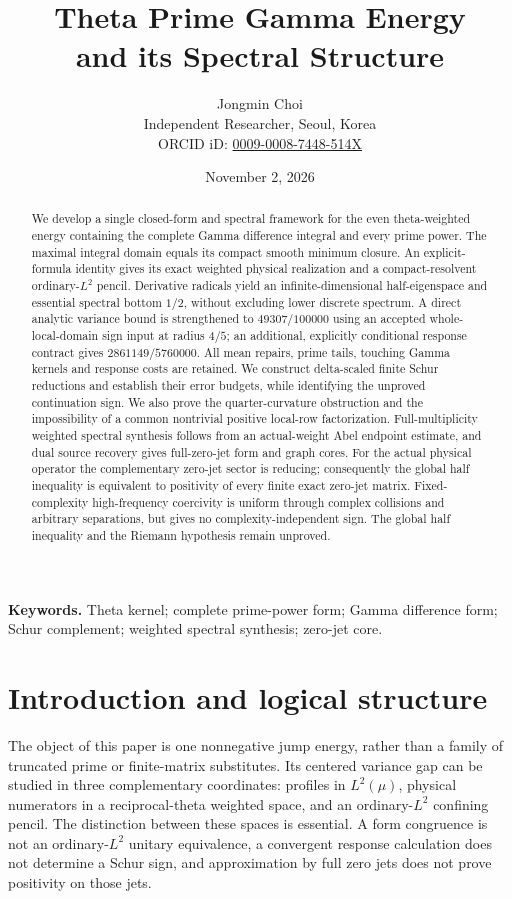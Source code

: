 \documentclass[11pt,a4paper]{article}
\title{Theta Prime Gamma Energy\\and its Spectral Structure}
\author{Jongmin Choi\\[3pt]\small Independent Researcher, Seoul, Korea\\\small ORCID iD: \href{https://orcid.org/0009-0008-7448-514X}{0009-0008-7448-514X}}
\date{November 2, 2026}
\numberwithin{equation}{section}
\theoremstyle{definition}\newtheorem{definition}[theorem]{Definition}
\theoremstyle{remark}\newtheorem{remark}[theorem]{Remark}
\begin{document}
\maketitle
\begin{abstract}
We develop a single closed-form and spectral framework for the even theta-weighted energy containing the complete Gamma difference integral and every prime power. The maximal integral domain equals its compact smooth minimum closure. An explicit-formula identity gives its exact weighted physical realization and a compact-resolvent ordinary-$L^2$ pencil. Derivative radicals yield an infinite-dimensional half-eigenspace and essential spectral bottom $1/2$, without excluding lower discrete spectrum. A direct analytic variance bound is strengthened to $49307/100000$ using an accepted whole-local-domain sign input at radius $4/5$; an additional, explicitly conditional response contract gives $2861149/5760000$. All mean repairs, prime tails, touching Gamma kernels and response costs are retained. We construct delta-scaled finite Schur reductions and establish their error budgets, while identifying the unproved continuation sign. We also prove the quarter-curvature obstruction and the impossibility of a common nontrivial positive local-row factorization. Full-multiplicity weighted spectral synthesis follows from an actual-weight Abel endpoint estimate, and dual source recovery gives full-zero-jet form and graph cores. For the actual physical operator the complementary zero-jet sector is reducing; consequently the global half inequality is equivalent to positivity of every finite exact zero-jet matrix. Fixed-complexity high-frequency coercivity is uniform through complex collisions and arbitrary separations, but gives no complexity-independent sign. The global half inequality and the Riemann hypothesis remain unproved.
\end{abstract}
\noindent\textbf{Keywords.} Theta kernel; complete prime-power form; Gamma difference form; Schur complement; weighted spectral synthesis; zero-jet core.
\tableofcontents

\section{Introduction and logical structure}\label{sec:intro}
The object of this paper is one nonnegative jump energy, rather than a family of truncated prime or finite-matrix substitutes. Its centered variance gap can be studied in three complementary coordinates: profiles in $L^2(\mu)$, physical numerators in a reciprocal-theta weighted space, and an ordinary-$L^2$ confining pencil. The distinction between these spaces is essential. A form congruence is not an ordinary-$L^2$ unitary equivalence, a convergent response calculation does not determine a Schur sign, and approximation by full zero jets does not prove positivity on those jets.
\end{document}
